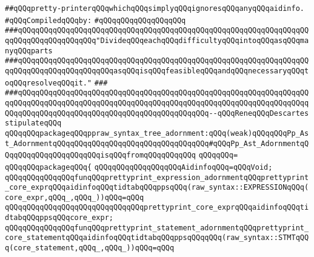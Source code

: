\label{src/lib/c-kit/src/ast/prettyprint/pp-ast.pkg}
\verb|##qQQqpretty-printerqQQqwhichqQQqsimplyqQQqignoresqQQqanyqQQqaidinfo.|\newline
\newline
\verb|#qQQqCompiledqQQqby:|\newline
\verb|#qQQqqQQqqQQqqQQqqQQq|\newline
\newline
\verb|###qQQqqQQqqQQqqQQqqQQqqQQqqQQqqQQqqQQqqQQqqQQqqQQqqQQqqQQqqQQqqQQqqQQqqQQqqQQqqQQqqQQqqQQq"DivideqQQqeachqQQqdifficultyqQQqintoqQQqasqQQqmanyqQQqparts|\newline
\verb|###qQQqqQQqqQQqqQQqqQQqqQQqqQQqqQQqqQQqqQQqqQQqqQQqqQQqqQQqqQQqqQQqqQQqqQQqqQQqqQQqqQQqqQQqqQQqasqQQqisqQQqfeasibleqQQqandqQQqnecessaryqQQqtoqQQqresolveqQQqit."|\newline
\verb|###|\newline
\verb|###qQQqqQQqqQQqqQQqqQQqqQQqqQQqqQQqqQQqqQQqqQQqqQQqqQQqqQQqqQQqqQQqqQQqqQQqqQQqqQQqqQQqqQQqqQQqqQQqqQQqqQQqqQQqqQQqqQQqqQQqqQQqqQQqqQQqqQQqqQQqqQQqqQQqqQQqqQQqqQQqqQQqqQQqqQQqqQQqqQQqqQQq--qQQqReneqQQqDescartes|\newline
\newline
\newline
\newline
\verb|stipulateqQQq|\newline
\verb|qQQqqQQqpackageqQQqppraw_syntax_tree_adornment:qQQq(weak)qQQqqQQqPp_Ast_AdornmentqQQqqQQqqQQqqQQqqQQqqQQqqQQqqQQqqQQq#qQQqPp_Ast_AdornmentqQQqqQQqqQQqqQQqqQQqqQQqisqQQqfromqQQqqQQqqQQq|\newline
\verb|qQQqqQQq=|\newline
\verb|qQQqqQQqpackageqQQq{|\newline
\verb|qQQqqQQqqQQqqQQqqQQqAidinfoqQQq=qQQqVoid;|\newline
\newline
\verb|qQQqqQQqqQQqqQQqfunqQQqprettyprint_expression_adornmentqQQqprettyprint_core_exprqQQqaidinfoqQQqtidtabqQQqppsqQQq(raw_syntax::EXPRESSIONqQQq(core_expr,qQQq_,qQQq_))qQQq=qQQq|\newline
\verb|qQQqqQQqqQQqqQQqqQQqqQQqqQQqqQQqprettyprint_core_exprqQQqaidinfoqQQqtidtabqQQqppsqQQqcore_expr;|\newline
\newline
\verb|qQQqqQQqqQQqqQQqfunqQQqprettyprint_statement_adornmentqQQqprettyprint_core_statementqQQqaidinfoqQQqtidtabqQQqppsqQQqqQQq(raw_syntax::STMTqQQq(core_statement,qQQq_,qQQq_))qQQq=qQQq|\newline
